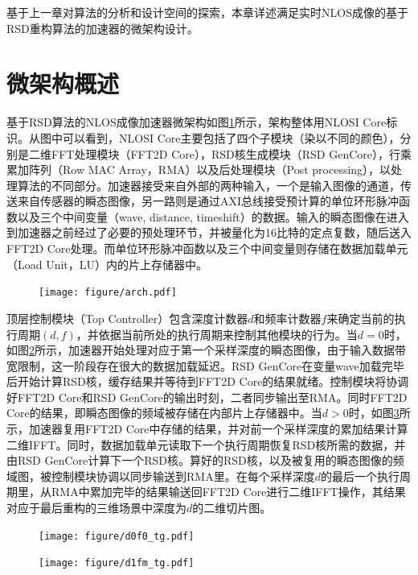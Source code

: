 \documentclass[master]{shtthesis}             %
\begin{document}
基于上一章对算法的分析和设计空间的探索，本章详述满足实时NLOS成像的基于RSD重构算法的加速器的微架构设计。

\section{微架构概述} \label{sec:setup_info}

基于RSD算法的NLOS成像加速器微架构如图\ref{fig:arch}所示，架构整体用NLOSI Core标识。从图中可以看到，NLOSI Core主要包括了四个子模块（染以不同的颜色），分别是二维FFT处理模块（FFT2D Core），RSD核生成模块（RSD GenCore），行乘累加阵列（Row MAC Array，RMA）以及后处理模块（Post processing），以处理算法的不同部分。加速器接受来自外部的两种输入，一个是输入图像的通道，传送来自传感器的瞬态图像，另一路则是通过AXI总线接受预计算的单位环形脉冲函数以及三个中间变量（wave, distance, timeshift）的数据。输入的瞬态图像在进入到加速器之前经过了必要的预处理环节，并被量化为16比特的定点复数，随后送入FFT2D Core处理。而单位环形脉冲函数以及三个中间变量则存储在数据加载单元（Load Unit，LU）内的片上存储器中。
\begin{figure}[!htb]
    \centering
    \texttt{[image: figure/arch.pdf]}
    \label{fig:arch}
\end{figure}

顶层控制模块（Top Controller）包含深度计数器$d$和频率计数器$f$来确定当前的执行周期$(d,f)$，并依据当前所处的执行周期来控制其他模块的行为。当$d=0$时，如图\ref{fig:tg_d0}所示，加速器开始处理对应于第一个采样深度的瞬态图像，由于输入数据带宽限制，这一阶段存在很大的数据加载延迟。RSD GenCore在变量wave加载完毕后开始计算RSD核，缓存结果并等待到FFT2D Core的结果就绪。控制模块将协调好FFT2D Core和RSD GenCore的输出时刻，二者同步输出至RMA。同时FFT2D Core的结果，即瞬态图像的频域被存储在内部片上存储器中。当$d>0$时，如图\ref{fig:tg_d1}所示，加速器复用FFT2D Core中存储的结果，并对前一个采样深度的累加结果计算二维IFFT。同时，数据加载单元读取下一个执行周期恢复RSD核所需的数据，并由RSD GenCore计算下一个RSD核。算好的RSD核，以及被复用的瞬态图像的频域图，被控制模块协调以同步输送到RMA里。在每个采样深度$d$的最后一个执行周期里，从RMA中累加完毕的结果输送回FFT2D Core进行二维IFFT操作，其结果对应于最后重构的三维场景中深度为$d$的二维切片图。
\begin{figure}[!tb]
    \centering
    \texttt{[image: figure/d0f0\_tg.pdf]}
    \label{fig:tg_d0}
\end{figure}
\begin{figure}[!tb]
    \centering
    \texttt{[image: figure/d1fm\_tg.pdf]}
    \label{fig:tg_d1}
\end{figure}
\end{document}
